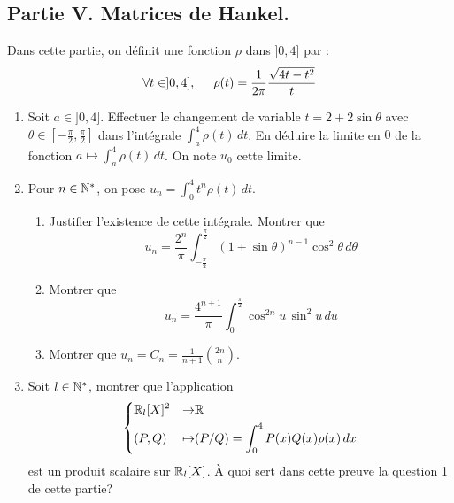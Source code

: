 \subsection*{Partie V. Matrices de Hankel.}
Dans cette partie, on définit une fonction $\rho$ dans $]0,4]$ par :
\begin{displaymath}
  \forall t \in ]0,4],\hspace{0.5cm} 
  \rho(t) = \frac{1}{2\pi} \frac{\sqrt{4t-t^2}}{t}
\end{displaymath}
\begin{enumerate}
  \item Soit $a\in ]0,4]$. Effectuer le changement de variable $t = 2 + 2\sin \theta$ avec $\theta \in [-\frac{\pi}{2},\frac{\pi}{2}]$ dans l'intégrale $\int_{a}^{4}\rho(t)\, dt$. En déduire la limite en $0$ de la fonction $a\mapsto \int_{a}^{4}\rho(t)\, dt$. On note $u_0$ cette limite.

  \item Pour $n\in \mathbb{N}^*$, on pose $u_n = \int_0^4 t^n\rho(t)\,dt$.
\begin{enumerate}
  \item Justifier l'existence de cette intégrale. Montrer que 
\begin{displaymath}
  u_n
= \frac{2^n}{\pi}\int_{-\frac{\pi}{2}}^{\frac{\pi}{2}}(1+\sin \theta)^{n-1}\cos^2 \theta \, d\theta
\end{displaymath}
 \item Montrer que
\begin{displaymath}
  u_n
= \frac{4^{n+1}}{\pi} \int_{0}^{\frac{\pi}{2}} \cos^{2n}u \,\sin^2 u \, du
\end{displaymath}
\item Montrer que $u_n=C_n = \frac{1}{n+1}\binom{2n}{n}$.
\end{enumerate}
  
\item Soit $l\in \mathbb{N}^*$, montrer que l'application
\begin{displaymath}
\left\lbrace 
\begin{aligned}
  &\mathbb{R}_l[X]^2 &\rightarrow &\mathbb{R} \\
  &(P,Q) &\mapsto &(P/Q) = \int_{0}^{4}P(x)Q(x)\rho(x)\,dx
\end{aligned}
\right. 
\end{displaymath}
est un produit scalaire sur $\mathbb{R}_l[X]$. \`A quoi sert dans cette preuve la question 1 de cette partie?


\end{enumerate}
